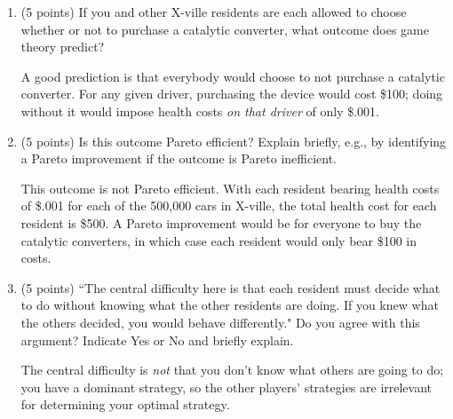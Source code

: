 \documentclass[twoside]{article}
\begin{document}
\begin{enumerate}
    \begin{enumerate}
    \item \begin{EXAM} (5 points) If you and other X-ville residents are each allowed to choose whether or not to purchase a catalytic converter, what outcome does game theory predict?  \end{EXAM}

\begin{KEY} A good prediction is that everybody would choose to not purchase a catalytic converter. For any given driver, purchasing the device would cost \$100; doing without it would impose health costs \emph{on that driver} of only \$.001. \end{KEY}

    \item \begin{EXAM} (5 points) Is this outcome Pareto efficient? Explain briefly, e.g., by identifying a Pareto improvement if the outcome is Pareto inefficient. \end{EXAM}

\begin{KEY}
This outcome is not Pareto efficient. With each resident bearing health costs of \$.001 for each of the 500,000 cars in X-ville, the total health cost for each resident is \$500. A Pareto improvement would be for everyone to buy the catalytic converters, in which case each resident would only bear \$100 in costs.
\end{KEY}

    \item \begin{EXAM} (5 points) ``The central difficulty here is that each resident must decide what to do without knowing what the other residents are doing. If you knew what the others decided, you would behave differently." Do you agree with this argument? Indicate Yes or No and briefly explain. \end{EXAM}

\begin{KEY}
The central difficulty is \emph{not} that you don't know what others are going to do; you have a dominant strategy, so the other players' strategies are irrelevant for determining your optimal strategy.
\end{KEY}

\begin{comment}
    \item (5 points) In ``The Tragedy of the Commons"\hspace{-.2em}, Garrett Hardin makes a distinction between two different ways of trying to reach the optimal outcome in this type of situation: ``appeals to conscience" and ``mutual coercion, mutually agreed upon"\hspace{-.2em}. Give an example of each in the context of the current problem.



\end{comment}
\end{enumerate}
\end{enumerate}
\end{document}
